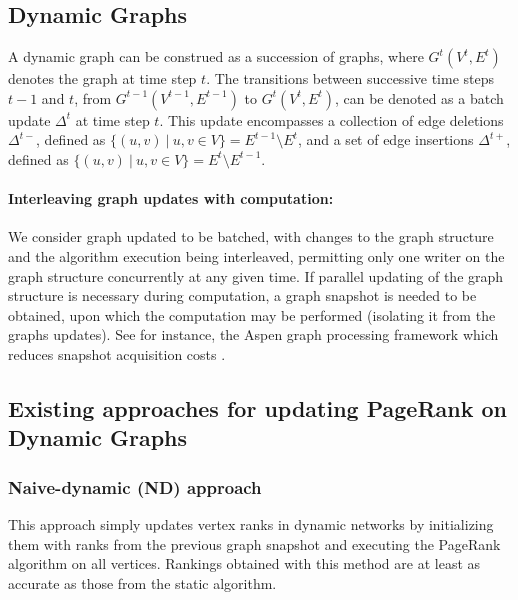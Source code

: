 \subsection{Dynamic Graphs}
\label{sec:about-dynamic}

A dynamic graph can be construed as a succession of graphs, where $G^t(V^t, E^t)$ denotes the graph at time step $t$. The transitions between successive time steps $t-1$ and $t$, from $G^{t-1}(V^{t-1}, E^{t-1})$ to $G^t(V^t, E^t)$, can be denoted as a batch update $\Delta^t$ at time step $t$. This update encompasses a collection of edge deletions $\Delta^{t-}$, defined as $\{(u, v)\ |\ u, v \in V\} = E^{t-1} \setminus E^t$, and a set of edge insertions $\Delta^{t+}$, defined as $\{(u, v)\ |\ u, v \in V\} = E^t \setminus E^{t-1}$.


\paragraph{Interleaving graph updates with computation:}

We consider graph updated to be batched, with changes to the graph structure and the algorithm execution being interleaved, permitting only one writer on the graph structure concurrently at any given time. If parallel updating of the graph structure is necessary during computation, a graph snapshot is needed to be obtained, upon which the computation may be performed (isolating it from the graphs updates). See for instance, the Aspen graph processing framework which reduces snapshot acquisition costs \cite{graph-dhulipala19}.




\subsection{Existing approaches for updating PageRank on Dynamic Graphs}

\subsubsection{Naive-dynamic (ND) approach}
\label{sec:about-naive}

This approach simply updates vertex ranks in dynamic networks by initializing them with ranks from the previous graph snapshot and executing the PageRank algorithm on all vertices. Rankings obtained with this method are at least as accurate as those from the static algorithm.


